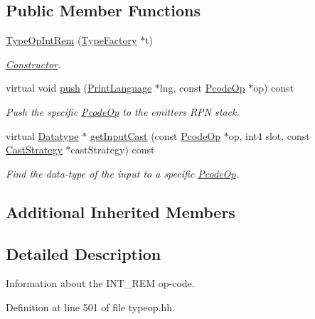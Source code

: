 \subsection*{Public Member Functions}
\begin{DoxyCompactItemize}
\item 
\mbox{\hyperlink{class_type_op_int_rem_a387d59c1b8b986034d8427ffb19a71c5}{Type\+Op\+Int\+Rem}} (\mbox{\hyperlink{class_type_factory}{Type\+Factory}} $\ast$t)
\begin{DoxyCompactList}\small\item\em \mbox{\hyperlink{class_constructor}{Constructor}}. \end{DoxyCompactList}\item 
virtual void \mbox{\hyperlink{class_type_op_int_rem_a3e100cddbe74736acf29d6706426ced0}{push}} (\mbox{\hyperlink{class_print_language}{Print\+Language}} $\ast$lng, const \mbox{\hyperlink{class_pcode_op}{Pcode\+Op}} $\ast$op) const
\begin{DoxyCompactList}\small\item\em Push the specific \mbox{\hyperlink{class_pcode_op}{Pcode\+Op}} to the emitter\textquotesingle{}s R\+PN stack. \end{DoxyCompactList}\item 
virtual \mbox{\hyperlink{class_datatype}{Datatype}} $\ast$ \mbox{\hyperlink{class_type_op_int_rem_a93c20ae0ea5bd1e4b45b675d044c9b6e}{get\+Input\+Cast}} (const \mbox{\hyperlink{class_pcode_op}{Pcode\+Op}} $\ast$op, int4 slot, const \mbox{\hyperlink{class_cast_strategy}{Cast\+Strategy}} $\ast$cast\+Strategy) const
\begin{DoxyCompactList}\small\item\em Find the data-\/type of the input to a specific \mbox{\hyperlink{class_pcode_op}{Pcode\+Op}}. \end{DoxyCompactList}\end{DoxyCompactItemize}
\subsection*{Additional Inherited Members}


\subsection{Detailed Description}
Information about the I\+N\+T\+\_\+\+R\+EM op-\/code. 

Definition at line 501 of file typeop.\+hh.



